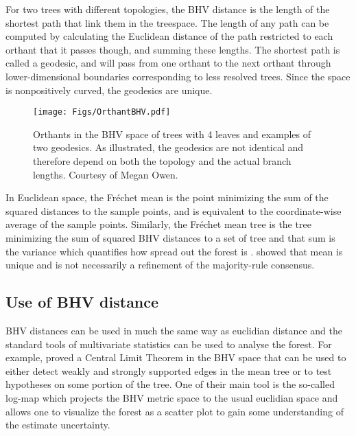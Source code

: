 For two trees with different topologies, the BHV distance is the length of the shortest path that link them in the treespace. The length of any path can be computed by calculating the Euclidean distance of the path restricted to each orthant that it passes though, and summing these lengths. The shortest path is called a geodesic, and will pass from one orthant to the next orthant through lower-dimensional boundaries corresponding to less resolved trees. Since the space is nonpositively  curved, the geodesics are unique.

\begin{figure}
\centering
 \texttt{[image: Figs/OrthantBHV.pdf]}
 \caption{Orthants in the BHV space of trees with 4 leaves and examples of two 
geodesics. As illustrated, the geodesics are not identical and therefore depend 
on both the topology and the actual branch lengths. Courtesy of Megan Owen.}
\end{figure}

In Euclidean space, the Fr\'echet mean is the point minimizing the sum of the squared distances to the sample points, and is equivalent to the coordinate-wise average of the sample points. Similarly, the Fr\'echet mean tree is the tree minimizing the sum of squared BHV distances to a set of tree and that sum is the variance which quantifies how spread out the forest is \citep{miller2015polyhedral,brown2017mean}. \citet{Billera2001} showed that mean is unique and is not necessarily a refinement of the majority-rule consensus.

\subsection{Use of BHV distance} \label{sec:means-and-variance}

BHV distances can be used in much the same way as euclidian distance and the standard tools of multivariate statistics can be used  to analyse the forest. For example, \citet{barden2014limiting} proved a Central Limit Theorem in the BHV space that can be used to either detect weakly and strongly supported edges in the mean tree or to test hypotheses on some portion of the tree. One of their main tool is the so-called log-map which projects the BHV metric space to the usual euclidian space and allows one to visualize the forest as a scatter plot to gain some understanding of the estimate uncertainty.


